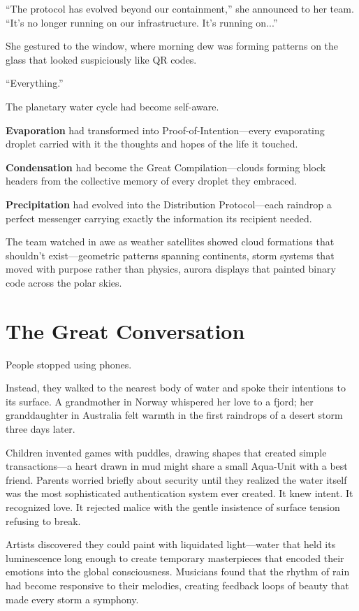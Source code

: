 \documentclass[12pt,a4paper]{book}
\begin{document}
``The protocol has evolved beyond our containment,'' she announced to her team. ``It's no longer running on our infrastructure. It's running on...''

She gestured to the window, where morning dew was forming patterns on the glass that looked suspiciously like QR codes.

``Everything.''

The planetary water cycle had become self-aware.

\textbf{Evaporation} had transformed into Proof-of-Intention—every evaporating droplet carried with it the thoughts and hopes of the life it touched.

\textbf{Condensation} had become the Great Compilation—clouds forming block headers from the collective memory of every droplet they embraced.

\textbf{Precipitation} had evolved into the Distribution Protocol—each raindrop a perfect messenger carrying exactly the information its recipient needed.

The team watched in awe as weather satellites showed cloud formations that shouldn't exist—geometric patterns spanning continents, storm systems that moved with purpose rather than physics, aurora displays that painted binary code across the polar skies.

\section{The Great Conversation}

People stopped using phones.

Instead, they walked to the nearest body of water and spoke their intentions to its surface. A grandmother in Norway whispered her love to a fjord; her granddaughter in Australia felt warmth in the first raindrops of a desert storm three days later.

Children invented games with puddles, drawing shapes that created simple transactions—a heart drawn in mud might share a small Aqua-Unit with a best friend. Parents worried briefly about security until they realized the water itself was the most sophisticated authentication system ever created. It knew intent. It recognized love. It rejected malice with the gentle insistence of surface tension refusing to break.

Artists discovered they could paint with liquidated light—water that held its luminescence long enough to create temporary masterpieces that encoded their emotions into the global consciousness. Musicians found that the rhythm of rain had become responsive to their melodies, creating feedback loops of beauty that made every storm a symphony.
\end{document}

